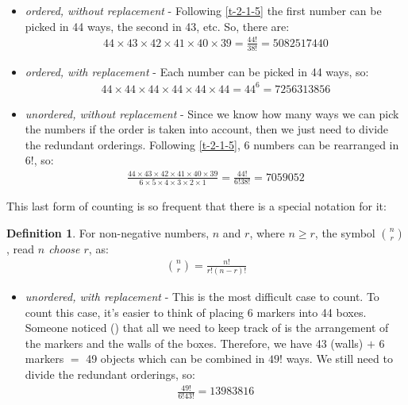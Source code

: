 \documentclass[
  oneside,
  11pt, a4paper,
  footinclude=true,
  headinclude=true,
  cleardoublepage=empty
]{scrbook}
\theoremstyle{definition}
\newtheorem{definition}{Definition}[section]
\theoremstyle{definition}
\begin{document}
        \begin{itemize}
            \item \emph{ordered, without replacement} - Following \ref{t-2-1-5} the first number can be picked in 44 ways, the second in 43, etc. So, there are:
            \begin{align*}
                44 \times 43 \times 42 \times 41 \times 40 \times 39 = \frac{44!}{38!} = 5082517440
            \end{align*}{}
            \item \emph{ordered, with replacement} - Each number can be picked in 44 ways, so:
            \begin{align*}
                44 \times 44 \times 44 \times 44 \times 44 \times 44 = 44^6 = 7256313856
            \end{align*}{}
            \item \emph{unordered, without replacement} - Since we know how many ways we can pick the numbers if the order is taken into account, then we just need to divide the redundant orderings. Following \ref{t-2-1-5}, 6 numbers can be rearranged in $6!$, so:
            \begin{align*}
                \frac{44 \times 43 \times 42 \times 41 \times 40 \times 39}{6 \times 5 \times 4 \times 3 \times 2 \times 1} = \frac{44!}{6!38!} = 7059052
            \end{align*}{}
        \end{itemize}{}
        
        This last form of counting is so frequent that there is a special notation for it:
        
        \begin{definition}{For non-negative numbers, $n$ and $r$, where $n \geq r$, the symbol $\binom{n}{r}$, read \emph{$n$ choose $r$}, as:}
            \begin{align*}
                \binom{n}{r} = \frac{n!}{r!(n-r)!}
            \end{align*}{}
        \end{definition}{}
       \begin{itemize}
            \item \emph{unordered, with replacement} - This is the most difficult case to count. To count this case, it's easier to think of placing 6 markers into 44 boxes. Someone noticed (\cite{feller-vol-2}) that all we need to keep track of is the arrangement of the markers and the walls of the boxes. Therefore, we have 43 (walls) $+$ 6 markers $=$ 49 objects which can be combined in $49!$ ways. We still need to divide the redundant orderings, so: 
            \begin{align*}
                \frac{49!}{6!43!} = 13983816
            \end{align*}{}
        \end{itemize}{}
        
\end{document}
